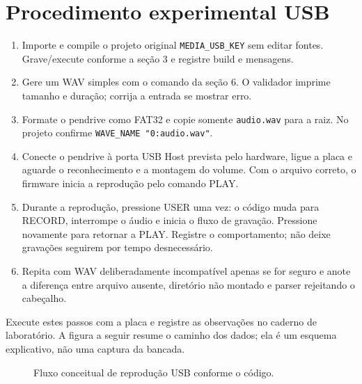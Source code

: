 \documentclass[12pt,journal,compsoc]{IEEEtran}
\begin{document}
\section{Procedimento experimental USB}
\begin{enumerate}
\item Importe e compile o projeto original \texttt{MEDIA\_USB\_KEY} sem editar fontes. Grave/execute conforme a seção 3 e registre build e mensagens.
\item Gere um WAV simples com o comando da seção 6. O validador imprime tamanho e duração; corrija a entrada se mostrar erro.
\item Formate o pendrive como FAT32 e copie somente \texttt{audio.wav} para a raiz. No projeto confirme \texttt{WAVE\_NAME "0:audio.wav"}.
\item Conecte o pendrive à porta USB Host prevista pelo hardware, ligue a placa e aguarde o reconhecimento e a montagem do volume. Com o arquivo correto, o firmware inicia a reprodução pelo comando PLAY.
\item Durante a reprodução, pressione USER uma vez: o código muda para RECORD, interrompe o áudio e inicia o fluxo de gravação. Pressione novamente para retornar a PLAY. Registre o comportamento; não deixe gravações seguirem por tempo desnecessário.
\item Repita com WAV deliberadamente incompatível apenas se for seguro e anote a diferença entre arquivo ausente, diretório não montado e parser rejeitando o cabeçalho.
\end{enumerate}
Execute estes passos com a placa e registre as observações no caderno de laboratório. A figura a seguir resume o caminho dos dados; ela é um esquema explicativo, não uma captura da bancada.

\begin{figure}[!ht]
\centering
{}
\caption{Fluxo conceitual de reprodução USB conforme o código.}
\label{fig:fluxo}
\end{figure}
\end{document}
